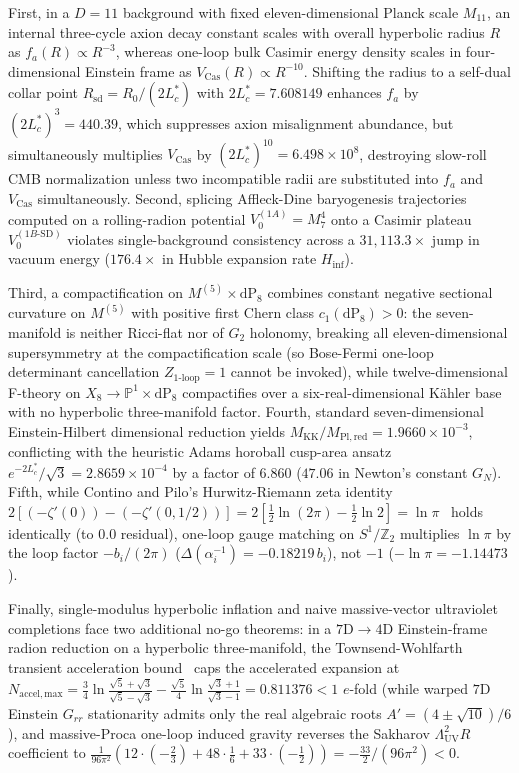 \documentclass[aps,prd,twocolumn,nofootinbib,floatfix]{revtex4-2}
\begin{document}
First, in a $D = 11$ background with fixed eleven-dimensional Planck scale $M_{11}$, an internal three-cycle axion decay constant scales with overall hyperbolic radius $R$ as $f_a(R) \propto R^{-3}$, whereas one-loop bulk Casimir energy density scales in four-dimensional Einstein frame as $V_{\mathrm{Cas}}(R) \propto R^{-10}$.
Shifting the radius to a self-dual collar point $R_{\mathrm{sd}} = R_0 / (2L_c^*)$ with $2L_c^* = 7.608149$ enhances $f_a$ by $(2L_c^*)^3 = 440.39$, which suppresses axion misalignment abundance, but simultaneously multiplies $V_{\mathrm{Cas}}$ by $(2L_c^*)^{10} = 6.498\times 10^8$, destroying slow-roll CMB normalization unless two incompatible radii are substituted into $f_a$ and $V_{\mathrm{Cas}}$ simultaneously.
Second, splicing Affleck-Dine baryogenesis trajectories computed on a rolling-radion potential $V_0^{(1A)} = M_7^4$ onto a Casimir plateau $V_0^{(1B\text{-}\mathrm{SD})}$ violates single-background consistency across a $31{,}113.3\times$ jump in vacuum energy ($176.4\times$ in Hubble expansion rate $H_{\mathrm{inf}}$).

Third, a compactification on $M^{(5)} \times \mathrm{dP}_8$ combines constant negative sectional curvature on $M^{(5)}$ with positive first Chern class $c_1(\mathrm{dP}_8) > 0$: the seven-manifold is neither Ricci-flat nor of $G_2$ holonomy, breaking all eleven-dimensional supersymmetry at the compactification scale (so Bose-Fermi one-loop determinant cancellation $Z_{\mathrm{1\text{-}loop}} = 1$ cannot be invoked), while twelve-dimensional F-theory on $X_8 \to \mathbb{P}^1 \times \mathrm{dP}_8$ compactifies over a six-real-dimensional K\"ahler base with no hyperbolic three-manifold factor.
Fourth, standard seven-dimensional Einstein-Hilbert dimensional reduction yields $M_{\mathrm{KK}}/M_{\mathrm{Pl,red}} = 1.9660\times 10^{-3}$, conflicting with the heuristic Adams horoball cusp-area ansatz $e^{-2L_c^*}/\sqrt{3} = 2.8659\times 10^{-4}$ by a factor of $6.860$ ($47.06$ in Newton's constant $G_N$).
Fifth, while Contino and Pilo's Hurwitz-Riemann zeta identity $2[(-\zeta'(0)) - (-\zeta'(0,1/2))] = 2[\frac{1}{2}\ln(2\pi) - \frac{1}{2}\ln 2] = \ln\pi$~\cite{ContinoPilo2001} holds identically (to $0.0$ residual), one-loop gauge matching on $S^1/\mathbb{Z}_2$ multiplies $\ln\pi$ by the loop factor $-b_i/(2\pi)$ ($\Delta(\alpha_i^{-1}) = -0.18219\,b_i$), not $-1$ ($-\ln\pi = -1.14473$).

Finally, single-modulus hyperbolic inflation and naive massive-vector ultraviolet completions face two additional no-go theorems: in a $7\mathrm{D} \to 4\mathrm{D}$ Einstein-frame radion reduction on a hyperbolic three-manifold, the Townsend-Wohlfarth transient acceleration bound~\cite{TownsendWohlfarth2003} caps the accelerated expansion at $N_{\mathrm{accel,max}} = \frac{3}{4}\ln\frac{\sqrt{5}+\sqrt{3}}{\sqrt{5}-\sqrt{3}} - \frac{\sqrt{5}}{4}\ln\frac{\sqrt{3}+1}{\sqrt{3}-1} = 0.811376 < 1$ $e$-fold (while warped $7\mathrm{D}$ Einstein $G_{rr}$ stationarity admits only the real algebraic roots $A' = (4\pm\sqrt{10})/6$), and massive-Proca one-loop induced gravity reverses the Sakharov $\Lambda_{\mathrm{UV}}^2 R$ coefficient to $\frac{1}{96\pi^2}(12\cdot(-\frac{2}{3}) + 48\cdot\frac{1}{6} + 33\cdot(-\frac{1}{2})) = -\frac{33}{2}/(96\pi^2) < 0$.
\end{document}
